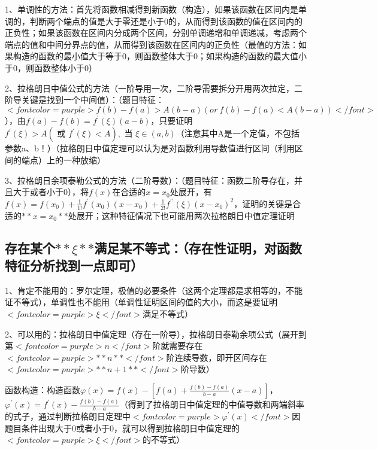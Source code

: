 1、单调性的方法：首先将函数相减得到新函数（构造），如果该函数在区间内是单调的，判断两个端点的值是大于零还是小于0的，从而得到该函数的值在区间内的正负性；如果该函数在区间内分成两个区间，分别单调递增和单调递减，考虑两个端点的值和中间分界点的值，从而得到该函数在区间内的正负性（最值的方法：如果构造的函数的最小值大于等于0，则函数整体大于0；如果构造的函数的最大值小于0，则函数整体小于0）

2、拉格朗日中值公式的方法（一阶导用一次，二阶导需要拆分开用两次拉定，二阶导关键是找到一个中间值）：（题目特征：$ <font color=purple>f(b)-f(a)>A(b-a)(or \ f(b)-f(a)<A(b-a))</font> $），由$ f(a)-f(b)=f^{\prime}(\xi)(a-b) $，只要证明$ f^{\prime}(\xi)>A\left(\text { 或 } f^{\prime}(\xi)<A\right), \text { 当 } \xi \in(a, b) $（注意其中A是一个定值，不包括参数a、b！）（拉格朗日中值定理可以认为是对函数利用导数值进行区间（利用区间的端点）上的一种放缩）

3、拉格朗日余项泰勒公式的方法（二阶导数）：（题目特征：函数二阶导存在，并且大于或者小于0），将$ f(x) $在合适的$ x=x_0 $处展开，有$ f(x)=f\left(x_{0}\right)+\frac{1}{1 !} f^{\prime}\left(x_{0}\right)\left(x-x_{0}\right)+\frac{1}{2 !} f^{\prime \prime}(\xi)\left(x-x_{0}\right)^{2} $，证明的关键是合适的$ **x=x_0** $处展开；这种特征情况下也可能用两次拉格朗日中值定理证明



\subsection{存在某个$ **\xi** $满足某不等式：（存在性证明，对函数特征分析找到一点即可）}

1、肯定不能用的：罗尔定理，极值的必要条件（这两个定理都是求相等的，不能证不等式），单调性也不能用（单调性证明区间的值的大小，而这是要证明$ <font color=purple>\xi</font> $满足不等式）

2、可以用的：拉格朗日中值定理（存在一阶导），拉格朗日泰勒余项公式（展开到第$ <font color=purple>n</font> $阶就需要存在$ <font color=purple>**n**</font> $阶连续导数，即开区间存在$ <font color=purple>**n+1**</font> $阶导数）

函数构造：构造函数$ \varphi(x)=f(x)-\left[f(a)+\frac{f(b)-f(a)}{b-a}(x-a)\right] $，$ \varphi^{\prime}(x)=f^{\prime}(x)-\frac{f(b)-f(a)}{b-a} $（得到了拉格朗日中值定理的中值导数和两端斜率的式子，通过判断拉格朗日定理中$ <font color=purple>\varphi^{\prime}(x)</font> $因题目条件出现大于0或者小于0，就可以得到拉格朗日中值定理的$ <font color=purple>\xi</font> $的不等式）



